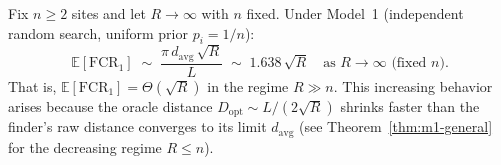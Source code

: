 \begin{theorem}\label{thm:m1-scaling}
Fix $n \geq 2$ sites and let $R \to \infty$ with $n$ fixed.
Under Model~1 (independent random search, uniform prior $p_i = 1/n$):
\begin{equation}\label{eq:m1-scaling}
  \mathbb{E}[\mathrm{FCR}_1]
  \;\sim\;
  \frac{\pi\,d_{\mathrm{avg}}\,\sqrt{R}}{L}
  \;\sim\; 1.638\,\sqrt{R}
  \quad \text{as } R \to \infty \text{ (fixed } n\text{)}.
\end{equation}
That is, $\mathbb{E}[\mathrm{FCR}_1] = \Theta(\sqrt{R})$ in the regime
$R \gg n$.
This increasing behavior arises because the oracle distance
$D_{\mathrm{opt}} \sim L/(2\sqrt{R})$ shrinks faster than the finder's
raw distance converges to its limit $d_{\mathrm{avg}}$
(see Theorem~\ref{thm:m1-general} for the decreasing regime $R \leq n$).
\end{theorem}

